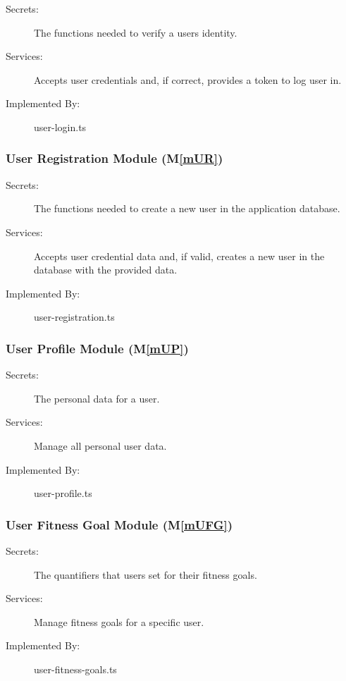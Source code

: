 \documentclass[12pt, titlepage]{article}
\newcommand{\mref}[1]{M\ref{#1}}
\begin{document}
\begin{description}
\item[Secrets:] The functions needed to verify a users identity. 
\item[Services:] Accepts user credentials and, if correct, provides a token to log user in.
\item[Implemented By:] user-login.ts
\end{description}

\subsubsection{User Registration Module (\mref{mUR})}

\begin{description}
\item[Secrets:] The functions needed to create a new user in the application database. 
\item[Services:] Accepts user credential data and, if valid, creates a new user in the database with the provided data.
\item[Implemented By:] user-registration.ts
\end{description}

\subsubsection{User Profile Module (\mref{mUP})}

\begin{description}
\item[Secrets:] The personal data for a user.
\item[Services:] Manage all personal user data.
\item[Implemented By:] user-profile.ts
\end{description}

\subsubsection{User Fitness Goal Module (\mref{mUFG})}

\begin{description}
\item[Secrets:] The quantifiers that users set for their fitness goals.
\item[Services:] Manage fitness goals for a specific user.
\item[Implemented By:] user-fitness-goals.ts
\end{description}
\end{document}
